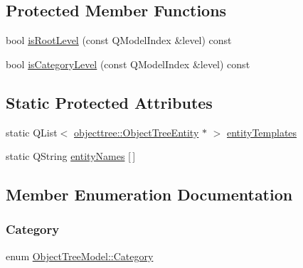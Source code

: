 \subsection*{Protected Member Functions}
\begin{DoxyCompactItemize}
\item 
bool \mbox{\hyperlink{class_object_tree_model_a7e2d94337dfc77e89a817be19196b4db}{is\+Root\+Level}} (const Q\+Model\+Index \&level) const
\item 
bool \mbox{\hyperlink{class_object_tree_model_a15b2b304cdd35cd8957bea2eb35255dd}{is\+Category\+Level}} (const Q\+Model\+Index \&level) const
\end{DoxyCompactItemize}
\subsection*{Static Protected Attributes}
\begin{DoxyCompactItemize}
\item 
static Q\+List$<$ \mbox{\hyperlink{classobjecttree_1_1_object_tree_entity}{objecttree\+::\+Object\+Tree\+Entity}} $\ast$ $>$ \mbox{\hyperlink{class_object_tree_model_a2dfc89b1f1dc78c36b875a1965c9d993}{entity\+Templates}}
\item 
static Q\+String \mbox{\hyperlink{class_object_tree_model_a9afba2e633aba40ce1869a1a2b0b9d30}{entity\+Names}} \mbox{[}$\,$\mbox{]}
\end{DoxyCompactItemize}


\subsection{Member Enumeration Documentation}
\mbox{\label{class_object_tree_model_a379e9d6b0d381853785adf62095ba4e3}} 
\subsubsection{\texorpdfstring{Category}{Category}}
{\footnotesize\ttfamily enum \mbox{\hyperlink{class_object_tree_model_a379e9d6b0d381853785adf62095ba4e3}{Object\+Tree\+Model\+::\+Category}}}

